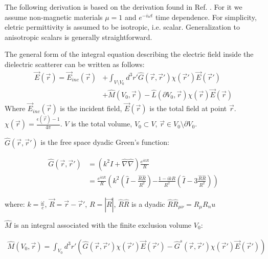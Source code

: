             The following derivation is based on the derivation found in Ref. \cite{yurkin2007discrete}. For it we assume
            non-magnetic materials $\mu = 1$ and $e^{-i\omega t}$ time dependence. For simplicity, eletric permittivity is assumed
            to be isotropic, i.e. scalar. Generalization to anisotropic scalars is generally straightforward.

            The general form of the integral equation describing the electric field inside the dielectric scatterer can be written as follows:
            \begin{align}
                \vec{E}(\vec{r}) = \vec{E}_{inc}(\vec{r}) &+ \int_{V \setminus V_0}d^3r' \hat{G}(\vec{r}, \vec{r}')\chi(\vec{r}')\vec{E}(\vec{r}')\nonumber\\
                                &+ \hat{M}(V_0, \vec{r}) - \hat{L}(\partial V_0, \vec{r})\chi(\vec{r})\vec{E}(\vec{r})
            \end{align}
            Where $\vec{E}_{inc}(\vec{r})$ is the incident field, $\vec{E}(\vec{r})$ is the total field at point $\vec{r}$.
            $\chi(\vec{r}) = \frac{\epsilon(\vec{r}) - 1}{4\pi}$. $V$ is the total volume, $V_0 \subset V$, $\vec{r} \in V_0\setminus \partial V_0$.

            $\hat{G}(\vec{r}, \vec{r}')$ is the free space dyadic Green's function:

            \begin{align}
                \hat{G}(\vec{r}, \vec{r}') &= \left(k^2\hat{I}+\hat{\nabla}\hat{\nabla}\right)\frac{e^{ikR}}{R} \\
                                            &= \frac{e^{ikR}}{R}\left(k^2\left(\hat{I}-\frac{\hat{R}\hat{R}}{R^2}\right)\right.
                                                \left.-\frac{1-ikR}{R^2}\left(\hat{I} -3 \frac{\hat{R}\hat{R}}{R^2}\right)\right)
            \end{align}

            where: $k = \frac{\omega}{c}$, $\vec{R} = \vec{r} - \vec{r}'$, $R = |\vec{R}|$, $\hat{R}\hat{R}$ is a dyadic $\hat{R}\hat{R}_{\mu\nu} = R_\mu R_nu$

            $\hat{M}$ is an integral associated with the finite exclusion volume $V_0$:

            \begin{align}
                \hat{M}(V_0, \vec{r}) = \int_{V_0}d^3r'\left(\hat{G}(\vec{r}, \vec{r}')\chi(\vec{r}')\vec{E}(\vec{r}')
                                        - \hat{G}^s(\vec{r}, \vec{r}')\chi(\vec{r}')\vec{E}(\vec{r}')\right)
            \end{align}

